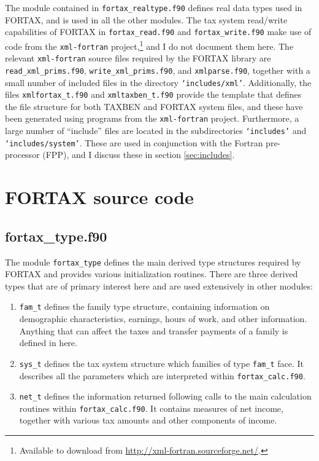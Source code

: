 \documentclass[11pt,thmsa,letter,ukenglish]{article}
\begin{document}
The module contained in \texttt{fortax\_realtype.f90} defines real data types used in FORTAX, and is used in all the other modules. The tax system read/write capabilities of FORTAX in \texttt{fortax\_read.f90} and \texttt{fortax\_write.f90} make use of code from the \texttt{xml-fortran} project,\footnote{Available to download from \url{http://xml-fortran.sourceforge.net/}.} and I do not document them here. The relevant \texttt{xml-fortran} source files required by the FORTAX library are \texttt{read\_xml\_prims.f90}, \texttt{write\_xml\_prims.f90}, and \texttt{xmlparse.f90}, together with a small number of included files in the directory \texttt{`includes/xml'}. Additionally, the files \texttt{xmlfortax\_t.f90} and \texttt{xmltaxben\_t.f90} provide the template that defines the file structure for both TAXBEN and FORTAX system files, and these have been generated using programs from the \texttt{xml-fortran} project. Furthermore, a large number of ``include'' files are located in the subdirectories \texttt{`includes'} and \texttt{`includes/system'}. These are used in conjunction with the Fortran pre-processor (FPP), and I discuss these in section \ref{sec:includes}.
\section{FORTAX source code}\label{sec:code}

\subsection{fortax\_type.f90}\label{sec:fortaxtype}
The module \texttt{fortax\_type} defines the main derived type structures required by FORTAX and provides various initialization routines. There are three derived types that are of primary interest here and are used extensively in other modules:
\begin{enumerate}
    \item \texttt{fam\_t} defines the family type structure, containing information on demographic characteristics, earnings, hours of work, and other information. Anything that can affect the taxes and transfer payments of a family is defined in here.
    \item \texttt{sys\_t} defines the tax system structure which families of type \texttt{fam\_t} face. It describes all the parameters which are interpreted within \texttt{fortax\_calc.f90}.
    \item \texttt{net\_t} defines the information returned following calls to the main calculation routines within \texttt{fortax\_calc.f90}. It contains measures of net income, together with various tax amounts and other components of income.
\end{enumerate}
\end{document}
